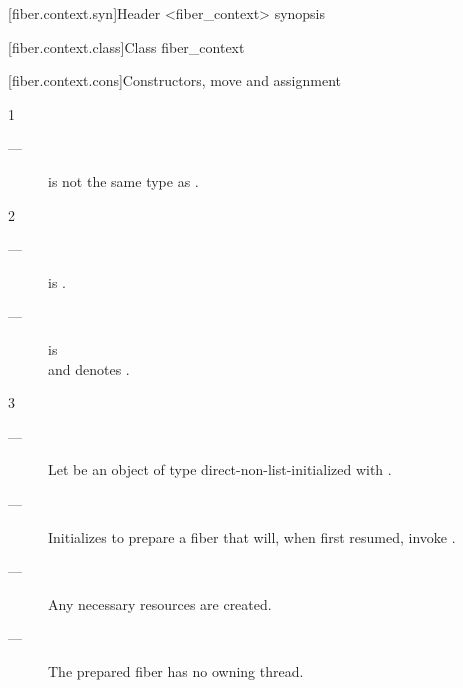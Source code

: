 [fiber.context.syn]{Header <fiber\_context> synopsis}


[fiber.context.class]{Class fiber\_context}


\newcommand{\state}{\cpp{state}}

[fiber.context.cons]{Constructors, move and assignment}


1 \constraints
\begin{description}
    \item[---]  is not the same type as \fiber.
\end{description}

2 \mandates
\begin{description}
    \item[---]  is \true.
    \item[---]  is \true\\
               and  denotes \fiber\cpp{\&\&}.
\end{description}

3 \effects
\begin{description}
    \item[---] Let  be an object of
               type  direct-non-list-initialized
               with . 
    \item[---] Initializes  to prepare a fiber that will, when
               first resumed, invoke .
    \item[---] Any necessary resources are created. 
    \item[---] The prepared fiber has no owning thread.
\end{description}

